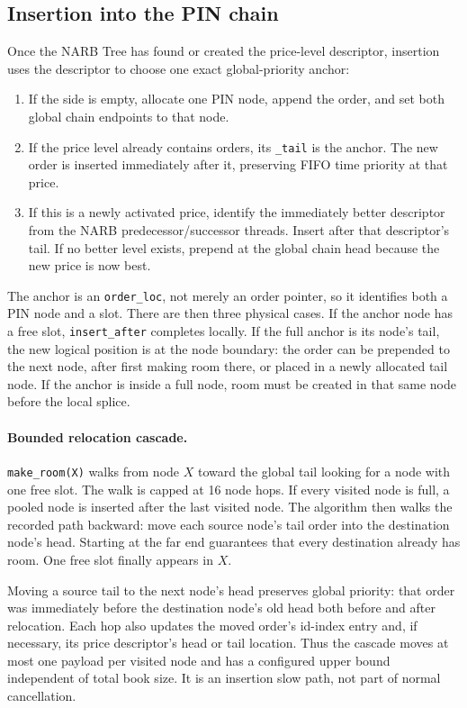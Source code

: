 \documentclass[10pt,twocolumn]{article}
\begin{document}
\subsection{Insertion into the PIN chain}

Once the NARB Tree has found or created the price-level descriptor, insertion
uses the descriptor to choose one exact global-priority anchor:
\begin{enumerate}
  \item If the side is empty, allocate one PIN node, append the order, and set
        both global chain endpoints to that node.
  \item If the price level already contains orders, its \texttt{\_tail} is the
        anchor.  The new order is inserted immediately after it, preserving FIFO
        time priority at that price.
  \item If this is a newly activated price, identify the immediately better
        descriptor from the NARB predecessor/successor threads.  Insert after
        that descriptor's tail.  If no better level exists, prepend at the global
        chain head because the new price is now best.
\end{enumerate}

The anchor is an \texttt{order\_loc}, not merely an order pointer, so it identifies
both a PIN node and a slot.  There are then three physical cases.  If the anchor
node has a free slot, \texttt{insert\_after} completes locally.  If the full
anchor is its node's tail, the new logical position is at the node boundary: the
order can be prepended to the next node, after first making room there, or placed
in a newly allocated tail node.  If the anchor is inside a full node, room must
be created in that same node before the local splice.

\paragraph{Bounded relocation cascade.}
\texttt{make\_room(X)} walks from node $X$ toward the global tail looking for a
node with one free slot.  The walk is capped at 16 node hops.  If every visited
node is full, a pooled node is inserted after the last visited node.  The
algorithm then walks the recorded path backward: move each source node's tail
order into the destination node's head.  Starting at the far end guarantees
that every destination already has room.  One free slot finally appears in
$X$.

Moving a source tail to the next node's head preserves global priority: that
order was immediately before the destination node's old head both before and
after relocation.  Each hop also updates the moved order's id-index entry and,
if necessary, its price descriptor's head or tail location.  Thus the cascade
moves at most one payload per visited node and has a configured upper bound
independent of total book size.  It is an insertion slow path, not part of normal
cancellation.
\end{document}
